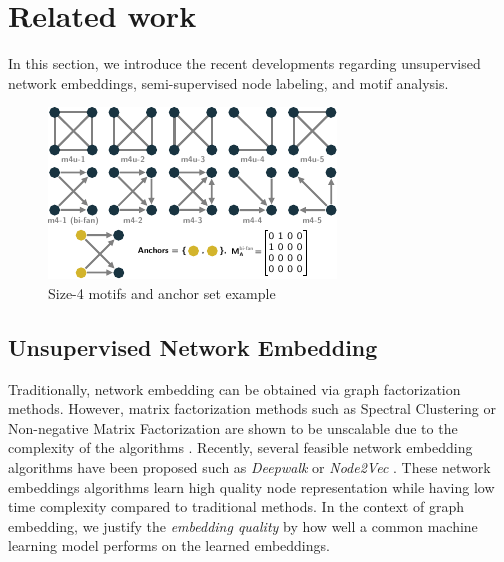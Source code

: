 \documentclass{article}
\theoremstyle{definition}
\begin{document}
\section{Related work}

In this section, we introduce the recent developments regarding unsupervised 
network embeddings, semi-supervised node labeling, and motif analysis.

\begin{figure} 
    \centering
    \includegraphics[width=0.9\linewidth]{m4}
    \caption{Size-4 motifs and anchor set example}
    \label{fig:m4}
\end{figure}

\subsection{Unsupervised Network Embedding}

Traditionally, network embedding can be obtained via graph 
factorization methods. However, matrix factorization methods such as
Spectral Clustering or Non-negative Matrix Factorization are 
shown to be unscalable due to the complexity of the algorithms 
\cite{deepwalk,eigmaps,pca}. Recently, several feasible network
embedding algorithms have been proposed such as \emph{Deepwalk}
\cite{deepwalk} or \emph{Node2Vec} \cite{node2vec}. These network embeddings 
algorithms learn high quality node representation while having low time
complexity compared to traditional methods. In the context of graph embedding, we 
justify the \emph{embedding quality} by how well a common machine learning model 
performs on the learned embeddings. 
\end{document}
